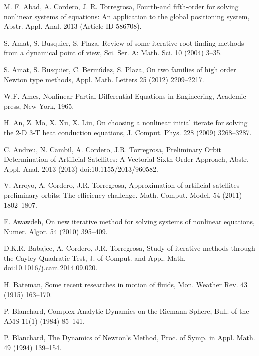 

\begin{thebibliography}{199}
\normalsize\rmfamily

 M. F. Abad, A. Cordero, J. R. Torregrosa, Fourth-and fifth-order for solving nonlinear systems of equations: An application to the global positioning system, Abstr. Appl. Anal.  2013 (Article ID 586708).

 S. Amat, S. Busquier, S. Plaza, Review of some iterative root-finding methods from a dynamical point of view,
Sci. Ser. A: Math. Sci. 10 (2004) 3--35.

 S. Amat, S. Busquier, C. Berm\'udez, S. Plaza,
On two families of high order Newton type methods,
Appl. Math. Letters 25 (2012) 2209--2217.

  W.F. Ames, Nonlinear Partial Differential Equations in Engineering, Academic press, New York, 1965.

   H. An, Z. Mo, X. Xu, X. Liu, On choosing a nonlinear initial iterate for solving the 2-D 3-T heat conduction equations, {J. Comput. Phys.} 228 ({2009})  3268--3287.

 C. Andreu, N. Cambil, A. Cordero, J.R. Torregrosa, Preliminary Orbit Determination of Artificial Satellites: A Vectorial Sixth-Order Approach, {Abstr. Appl. Anal.} 2013 ({2013}) doi:10.1155/2013/960582.

 V. Arroyo, A. Cordero, J.R. Torregrosa, Approximation of artificial satellites preliminary orbits: The
efficiency challenge. {Math. Comput. Model.} 54 ({2011})  1802--1807.

 F. Awawdeh, On new iterative method for solving systems of nonlinear equations, Numer. Algor.  54 (2010) 395--409.

 D.K.R. Babajee, A. Cordero, J.R. Torregrosa,
Study of iterative methods through the Cayley Quadratic Test,
J. of Comput. and Appl. Math. doi:10.1016/j.cam.2014.09.020.

 H. Bateman, Some recent researches in motion of fluids, Mon. Weather Rev. 43 (1915) 163--170.

 P. Blanchard,
Complex Analytic Dynamics on the Riemann Sphere,
Bull. of the AMS 11(1) (1984) 85--141.

  P. Blanchard,
The Dynamics of Newton's Method,
Proc. of Symp. in Appl. Math.  49 (1994) 139--154.


\end{thebibliography}
